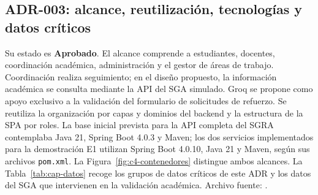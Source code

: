 \subsection{ADR-003: alcance, reutilización, tecnologías y datos críticos}
Su estado es \textbf{Aprobado}. El alcance comprende a estudiantes, docentes, coordinación académica, administración y el gestor de áreas de trabajo. Coordinación realiza seguimiento; en el diseño propuesto, la información académica se consulta mediante la API del SGA simulado. Groq se propone como apoyo exclusivo a la validación del formulario de solicitudes de refuerzo. Se reutiliza la organización por capas y dominios del backend y la estructura de la SPA por roles. La base inicial prevista para la API completa del SGRA contemplaba Java 21, Spring Boot 4.0.3 y Maven; los dos servicios implementados para la demostración E1 utilizan Spring Boot 4.0.10, Java 21 y Maven, según sus archivos \texttt{pom.xml}. La Figura~\ref{fig:c4-contenedores} distingue ambos alcances. La Tabla~\ref{tab:cap-datos} recoge los grupos de datos críticos de este ADR y los datos del SGA que intervienen en la validación académica. Archivo fuente: .
